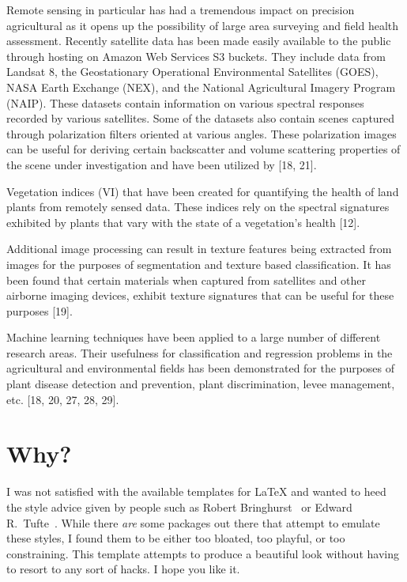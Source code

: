 Remote sensing in particular has had a tremendous impact on precision agricultural as it opens up the possibility of large area surveying and field health assessment.  Recently satellite data has been made easily available to the public through hosting on Amazon Web Services S3 buckets.  They include data from Landsat 8, the Geostationary Operational Environmental Satellites (GOES), NASA Earth Exchange (NEX), and the National Agricultural Imagery Program (NAIP).  These datasets contain information on various spectral responses recorded by various satellites.  Some of the datasets also contain scenes captured through polarization filters oriented at various angles. These polarization images can be useful for deriving certain backscatter and volume scattering properties of the scene under investigation and have been utilized by [18, 21].

Vegetation indices (VI) that have been created for quantifying the health of land plants from remotely sensed data.  These indices rely on the spectral signatures exhibited by plants that vary with the state of a vegetation’s health [12].

Additional image processing can result in texture features being extracted from images for the purposes of segmentation and texture based classification.  It has been found that certain materials when captured from satellites and other airborne imaging devices, exhibit texture signatures that can be useful for these purposes [19].

Machine learning techniques have been applied to a large number of different research areas.  Their usefulness for classification and regression problems in the agricultural and environmental fields has been demonstrated for the purposes of plant disease detection and prevention, plant discrimination, levee management, etc. [18, 20, 27, 28, 29].


\section{Why?}

I was not satisfied with the available templates for \LaTeX{} and wanted
to heed the style advice given by people such as Robert
Bringhurst~\cite{Bringhurst12} or Edward R.\
Tufte~\cite{Tufte90,Tufte01}. While there \emph{are} some packages out
there that attempt to emulate these styles, I found them to be either
too bloated, too playful, or too constraining. This template attempts to
produce a beautiful look without having to resort to any sort of hacks.
I hope you like it.

